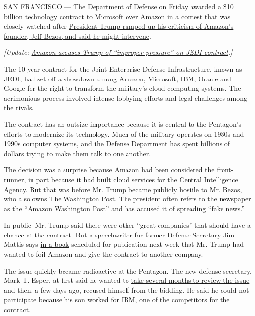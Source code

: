 SAN FRANCISCO --- The Department of Defense on Friday
\href{https://www.defense.gov/Newsroom/Contracts/Contract/Article/1999639/}{awarded
a \$10 billion technology contract} to Microsoft over Amazon in a
contest that was closely watched after
\href{https://www.nytimes.com/2019/07/18/us/politics/trump-amazon-defense-department-contract.html}{President
Trump ramped up his criticism of Amazon's founder, Jeff Bezos, and said
he might intervene}.

\emph{{[}Update:}
\href{https://www.nytimes.com/2019/12/09/technology/amazon-pentagon-contract-trump.html}{\emph{Amazon
accuses Trump of ``improper pressure'' on JEDI contract}}\emph{.{]}}

The 10-year contract for the Joint Enterprise Defense Infrastructure,
known as JEDI, had set off a showdown among Amazon, Microsoft, IBM,
Oracle and Google for the right to transform the military's cloud
computing systems. The acrimonious process involved intense lobbying
efforts and legal challenges among the rivals.

The contract has an outsize importance because it is central to the
Pentagon's efforts to modernize its technology. Much of the military
operates on 1980s and 1990s computer systems, and the Defense Department
has spent billions of dollars trying to make them talk to one another.

The decision was a surprise because
\href{https://www.nytimes.com/2019/08/02/us/politics/amazon-pentagon-contract-trump.html}{Amazon
had been considered the front-runner}, in part because it had built
cloud services for the Central Intelligence Agency. But that was before
Mr. Trump became publicly hostile to Mr. Bezos, who also owns The
Washington Post. The president often refers to the newspaper as the
``Amazon Washington Post'' and has accused it of spreading ``fake
news.''

In public, Mr. Trump said there were other ``great companies'' that
should have a chance at the contract. But a speechwriter for former
Defense Secretary Jim Mattis says
\href{https://www.washingtonpost.com/national-security/2019/10/23/syria-disagreement-with-trump-used-pretext-mattiss-departure-pentagon-chief-new-book-says/}{in
a book} scheduled for publication next week that Mr. Trump had wanted to
foil Amazon and give the contract to another company.

The issue quickly became radioactive at the Pentagon. The new defense
secretary, Mark T. Esper, at first said he wanted to
\href{https://www.nytimes.com/2019/08/01/us/politics/amazon-pentagon-contract.html}{take
several months to review the issue} and then, a few days ago, recused
himself from the bidding. He said he could not participate because his
son worked for IBM, one of the competitors for the contract.

